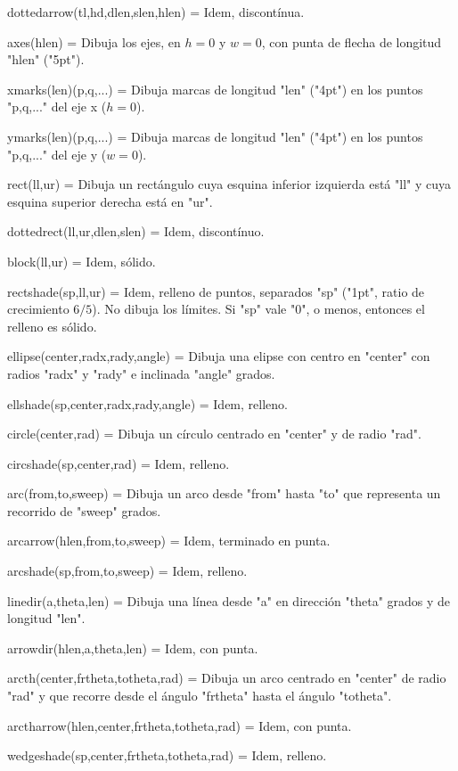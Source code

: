\macro dottedarrow(tl,hd,dlen,slen,hlen) = Idem, discontínua.

\macro axes(hlen) = Dibuja los ejes, en $h=0$ y $w=0$, con punta de
flecha de longitud "hlen" ("5pt").

\macro xmarks(len)(p,q,...) = Dibuja marcas de longitud "len"
("4pt") en los puntos "p,q,..." del eje x ($h=0$).

\macro ymarks(len)(p,q,...) = Dibuja marcas de longitud "len"
("4pt") en los puntos "p,q,..." del eje y ($w=0$).

\macro rect(ll,ur) = Dibuja un rectángulo cuya esquina inferior
izquierda está "ll" y cuya esquina superior derecha está en "ur".

\macro dottedrect(ll,ur,dlen,slen) = Idem, discontínuo.

\macro block(ll,ur) = Idem, sólido.

\macro rectshade(sp,ll,ur) = Idem, relleno de puntos, separados "sp"
("1pt", ratio de crecimiento $6/5$).  No dibuja los límites.  Si
"sp" vale "0", o menos, entonces el relleno es sólido.

\macro ellipse(center,radx,rady,angle) = Dibuja una elipse con
centro en "center" con radios "radx" y "rady" e inclinada "angle"
grados.

\macro ellshade(sp,center,radx,rady,angle) = Idem, relleno.

\macro circle(center,rad) = Dibuja un círculo centrado en "center" y
de radio "rad".

\macro circshade(sp,center,rad) = Idem, relleno.

\macro arc(from,to,sweep) = Dibuja un arco desde "from" hasta "to"
que representa un recorrido de "sweep" grados.

\macro arcarrow(hlen,from,to,sweep) = Idem, terminado en punta.

\macro arcshade(sp,from,to,sweep) = Idem, relleno.

\macro linedir(a,theta,len) = Dibuja una línea desde "a" en
dirección "theta" grados y de longitud "len".

\macro arrowdir(hlen,a,theta,len) = Idem, con punta.

\macro arcth(center,frtheta,totheta,rad) = Dibuja un arco centrado
en "center" de radio "rad" y que recorre desde el ángulo "frtheta"
hasta el ángulo "totheta".

\macro arctharrow(hlen,center,frtheta,totheta,rad) = Idem, con
punta.

\macro wedgeshade(sp,center,frtheta,totheta,rad) = Idem, relleno.


